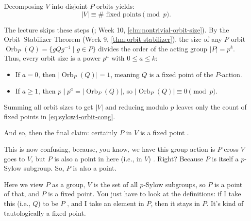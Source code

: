 \begin{proofWrapper}
\begin{content}
Decomposing $V$ into disjoint $P$-orbits yields:
\begin{equation}\label{eq:sylow4-orbit-cong}
|V| \equiv \#\text{ fixed points} \pmod p.
\end{equation}

\begin{steps}
The lecture skips these steps (; Week 10, \cref{clm:nontrivial-orbit-size}). By the Orbit--Stabilizer Theorem (Week 9, \cref{thm:orbit-stabilizer}), the size of any $P$-orbit $\operatorname{Orb}_P(Q) = \{ g Q g^{-1} \mid g \in P \}$ divides the order of the acting group $|P| = p^k$. Thus, every orbit size is a power $p^a$ with $0 \le a \le k$:
\begin{itemize}
    \item If $a = 0$, then $|\operatorname{Orb}_P(Q)| = 1$, meaning $Q$ is a fixed point of the $P$-action.
    \item If $a \ge 1$, then $p \mid p^a = |\operatorname{Orb}_P(Q)|$, so $|\operatorname{Orb}_P(Q)| \equiv 0 \pmod p$.
\end{itemize}
Summing all orbit sizes to get $|V|$ and reducing modulo $p$ leaves only the count of fixed points in \eqref{eq:sylow4-orbit-cong}.
\end{steps}
\end{content}

\begin{hidden}
\end{hidden}

\begin{speech}[00:07:01 - 00:08:40]
And so, then the final claim: certainly $P$ in $V$ is a fixed point .

This is now confusing, because, you know, we have this group action is $P$ cross $V$ goes to $V$, but $P$ is also a point in here (i.e., in $V$) . Right? Because $P$ is itself a $p$-Sylow subgroup. So, $P$ is also a point.

Here we view $P$ as a group, $V$ is the set of all $p$-Sylow subgroups, so $P$ is a point of that, and $P$ is a fixed point. You just have to look at the definitions: if I take this (i.e., $Q$) to be $P$ , and I take an element in $P$, then it stays in $P$. It's kind of tautologically a fixed point.


\end{speech}
\end{proofWrapper}
